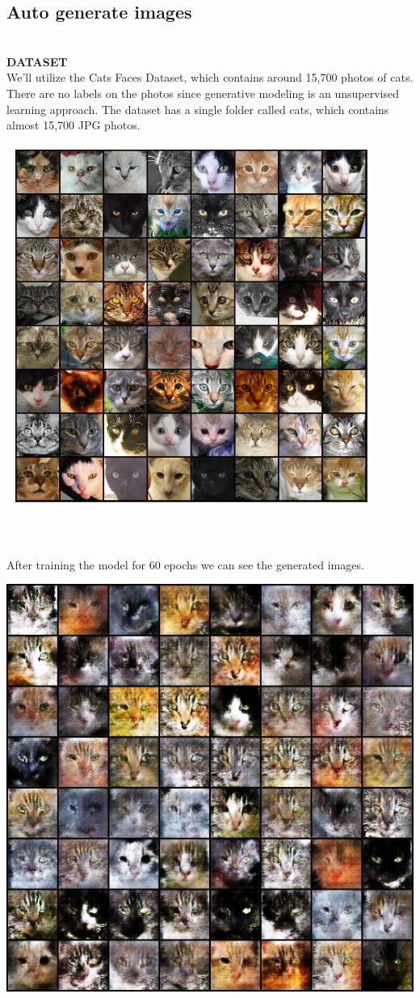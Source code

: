 \documentclass[14pt]{article}
\begin{document}
\subsection{Auto generate images}\\
\textbf{DATASET}\\
We'll utilize the Cats Faces Dataset, which contains around 15,700 photos of cats. There are no labels on the photos since generative modeling is an unsupervised learning approach. The dataset has a single folder called cats, which contains almost 15,700 JPG photos.
\\
\begin{center}
    \includegraphics[width = 9 cm ]{dataset_cat.png}
    \\ \\ 
\end{center} 
\\
After training the model for 60 epochs we can see the generated images. 
\\
\begin{center}
    \includegraphics[width = 8.5 cm ]{25.png}
    \\ \\ 
\end{center} 
\end{document}
